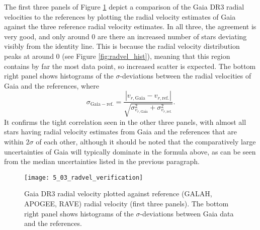 \documentclass[a4paper,11pt]{article}
\begin{document}
%
The first three panels of Figure \ref{fig:radvel_ver} depict a comparison of the Gaia DR3 radial velocities to the references by plotting the radial velocity estimates of Gaia against the three reference radial velocity estimates. In all three, the agreement is very good, and only around 0 are there an increased number of stars deviating visibly from the identity line. This is because the radial velocity distribution peaks at around 0 (see Figure \ref{fig:radvel_hist}), meaning that this region contains by far the most data point, so increased scatter is expected. The bottom right panel shows histograms of the $\sigma$-deviations between the radial velocities of Gaia and the references, where 
%
\begin{equation}
 \sigma_\mathrm{Gaia-ref.}=\frac{|v_{r,\mathrm{Gaia}}-v_{r,\mathrm{ref.}}|}{\sqrt{\sigma_{v_{r,\mathrm{Gaia}}}^2+\sigma_{v_{r,\mathrm{ref.}}}^2}}.
\end{equation}
%
It confirms the tight correlation seen in the other three panels, with almost all stars having radial velocity estimates from Gaia and the references that are within $2\sigma$ of each other, although it should be noted that the comparatively large uncertainties of Gaia will typically dominate in the formula above, as can be seen from the median uncertainties listed in the previous paragraph.
%
\begin{figure}[ht]
 \centering
 \texttt{[image: 5\_03\_radvel\_verification]}
 \caption[Radial velocity comparison to reference catalogues]{Gaia DR3 radial velocity plotted against reference (GALAH, APOGEE, RAVE) radial velocity (first three panels). The bottom right panel shows histograms of the $\sigma$-deviations between Gaia data and the references.}
 \label{fig:radvel_ver}
\end{figure}
%
\end{document}
